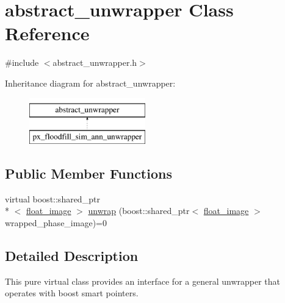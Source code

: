\hypertarget{classabstract__unwrapper}{\section{abstract\-\_\-unwrapper Class Reference}
\label{classabstract__unwrapper}
}


{\ttfamily \#include $<$abstract\-\_\-unwrapper.\-h$>$}

Inheritance diagram for abstract\-\_\-unwrapper\-:\begin{figure}[H]
\begin{center}
\leavevmode
\includegraphics[height=2.000000cm]{classabstract__unwrapper}
\end{center}
\end{figure}
\subsection*{Public Member Functions}
\begin{DoxyCompactItemize}
\item 
virtual boost\-::shared\-\_\-ptr\\*
$<$ \hyperlink{classfloat__image}{float\-\_\-image} $>$ \hyperlink{classabstract__unwrapper_af7d5640f6f7e8beb7f7829c2260b94ee}{unwrap} (boost\-::shared\-\_\-ptr$<$ \hyperlink{classfloat__image}{float\-\_\-image} $>$ wrapped\-\_\-phase\-\_\-image)=0
\end{DoxyCompactItemize}


\subsection{Detailed Description}
This pure virtual class provides an interface for a general unwrapper that operates with boost smart pointers. 

